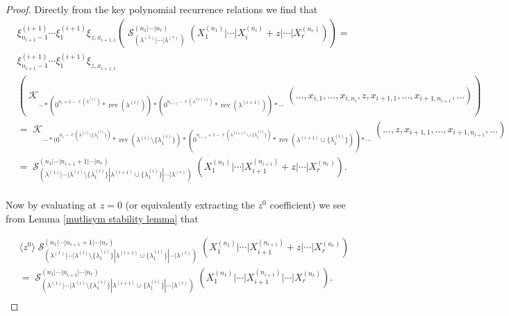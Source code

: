 \documentclass[12pt,reqno]{amsart}
\theoremstyle{definition}
\DeclareMathOperator{\rev}{rev}
\DeclareMathOperator{\cK}{\mathcal{K}}
\DeclareMathOperator{\cS}{\mathcal{S}}
\begin{document}
\begin{proof}
    Directly from the key polynomial recurrence relations we find that
    \begin{align*}
        &\xi^{(i+1)}_{n_{i+1}-1}\cdots \xi^{(i+1)}_{1} \xi_{z,x_{i+1,1}}\left( \cS_{(\lambda^{(1)}|\cdots |\lambda^{(r)})}^{(n_1|\cdots|n_r)} (X_1^{(n_1)}|\cdots| X_{i}^{(n_i)}+z|\cdots |X_r^{(n_r)}) \right)= \\
        & \xi^{(i+1)}_{n_{i+1}-1}\cdots \xi^{(i+1)}_{1} \xi_{z,x_{i+1,1}} \\
        & \left( \cK_{\cdots * (0^{n_{i}+1-\ell(\lambda^{(i)})}*\rev(\lambda^{(i)}))*(0^{n_{i+1}-\ell(\lambda^{(i+1)})}*\rev(\lambda^{(i+1)}))*\cdots}(\ldots,x_{i,1},\ldots,x_{i,n_{i}},z,x_{i+1,1},\ldots, x_{i+1,n_{i+1}},\ldots) \right) \\
        &= \cK_{\cdots * (0^{n_{i}-\ell(\lambda^{(i)}\setminus \{\lambda^{(i)}_{1}\})}*\rev(\lambda^{(i)}\setminus \{\lambda^{(i)}_{1}\})*(0^{n_{i+1}+1-\ell(\lambda^{(i+1)} \cup \{\lambda^{(i)}_{1}\})}*\rev(\lambda^{(i+1)} \cup \{\lambda^{(i)}_{1}\}))*\cdots}(\ldots,z,x_{i+1,1},\ldots, x_{i+1,n_{i+1}},\ldots) \\
        &= \cS_{(\lambda^{(1)}|\cdots|\lambda^{(i)}\setminus \{\lambda^{(i)}_{1}\}|\lambda^{(i+1)} \cup \{\lambda^{(i)}_{1}\}|\cdots |\lambda^{(r)})}^{(n_1|\cdots|n_{i+1}+1|\cdots |n_r)} (X_1^{(n_1)}|\cdots|X_{i+1}^{(n_{i+1})}+z|\cdots |X_r^{(n_r)}).\\
    \end{align*}

Now by evaluating at $z = 0$ (or equivalently extracting the $z^0$ coefficient) we see from Lemma \ref{mutlisym stability lemma} that 


\begin{align*}
    &\langle z^0 \rangle \cS_{(\lambda^{(1)}|\cdots|\lambda^{(i)}\setminus \{\lambda^{(i)}_{1}\}|\lambda^{(i+1)} \cup \{\lambda^{(i)}_{1}\}|\cdots |\lambda^{(r)})}^{(n_1|\cdots|n_{i+1}+1|\cdots |n_r)} (X_1^{(n_1)}|\cdots|X_{i+1}^{(n_{i+1})}+z|\cdots |X_r^{(n_r)}) \\
    &= \cS_{(\lambda^{(1)}|\cdots|\lambda^{(i)}\setminus \{\lambda^{(i)}_{1}\}|\lambda^{(i+1)} \cup \{\lambda^{(i)}_{1}\}|\cdots |\lambda^{(r)})}^{(n_1|\cdots|n_{i+1}|\cdots |n_r)} (X_1^{(n_1)}|\cdots|X_{i+1}^{(n_{i+1})}|\cdots |X_r^{(n_r)}).\\
\end{align*}



    
\end{proof}
\end{document}
